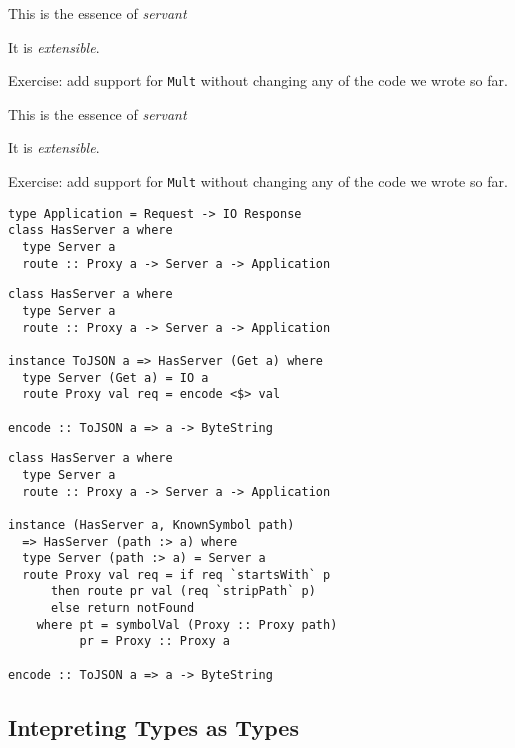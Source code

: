 \documentclass{beamer}
\begin{document}
\begin{frame}
This is the essence of \textit{servant}

It is \textit{extensible}.

Exercise: add support for \texttt{Mult} without changing any of the code we
wrote so far.
\end{frame}

\begin{frame}
This is the essence of \textit{servant}

It is \textit{extensible}.

Exercise: add support for \texttt{Mult} without changing any of the code we
wrote so far.
\end{frame}

\begin{frame}[fragile]
\begin{verbatim}
type Application = Request -> IO Response
class HasServer a where
  type Server a
  route :: Proxy a -> Server a -> Application
\end{verbatim}
\end{frame}


\begin{frame}[fragile]
\begin{verbatim}
class HasServer a where
  type Server a
  route :: Proxy a -> Server a -> Application

instance ToJSON a => HasServer (Get a) where
  type Server (Get a) = IO a
  route Proxy val req = encode <$> val

encode :: ToJSON a => a -> ByteString
\end{verbatim}
\end{frame}

\begin{frame}[fragile]
\begin{verbatim}
class HasServer a where
  type Server a
  route :: Proxy a -> Server a -> Application

instance (HasServer a, KnownSymbol path)
  => HasServer (path :> a) where
  type Server (path :> a) = Server a
  route Proxy val req = if req `startsWith` p
      then route pr val (req `stripPath` p)
      else return notFound
    where pt = symbolVal (Proxy :: Proxy path)
          pr = Proxy :: Proxy a

encode :: ToJSON a => a -> ByteString
\end{verbatim}
\end{frame}

\subsection{Intepreting Types as Types} %
\end{document}
